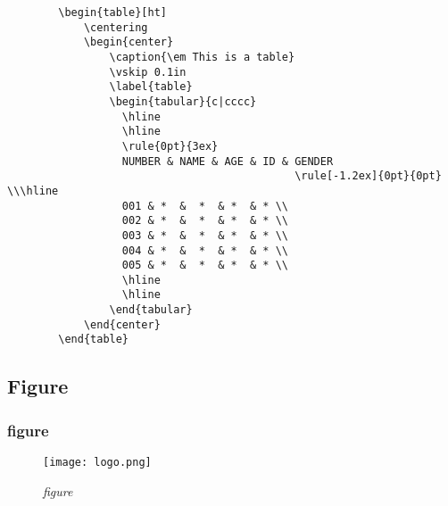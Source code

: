 \documentclass[a4paper, 12pt]{article}
\begin{document}
\begin{listing}[ht]
    \begin{verbatim}
        \begin{table}[ht]
            \centering
            \begin{center}
                \caption{\em This is a table}
                \vskip 0.1in
                \label{table}
                \begin{tabular}{c|cccc}
                  \hline
                  \hline
                  \rule{0pt}{3ex}
                  NUMBER & NAME & AGE & ID & GENDER 
                                             \rule[-1.2ex]{0pt}{0pt} \\\hline
                  001 & *  &  *  & *  & * \\ 
                  002 & *  &  *  & *  & * \\
                  003 & *  &  *  & *  & * \\      
                  004 & *  &  *  & *  & * \\
                  005 & *  &  *  & *  & * \\
                  \hline
                  \hline 
                \end{tabular}
            \end{center}
        \end{table}
    \end{verbatim}
    \caption{\em Table}
    \label{table}
\end{listing}

\clearpage
\subsection{Figure}

\subsubsection{figure}
\begin{figure}[H]
    \centering \texttt{[image: logo.png]}
    \caption{\em figure}
    \label{fig:mesh}
\end{figure}
\end{document}
